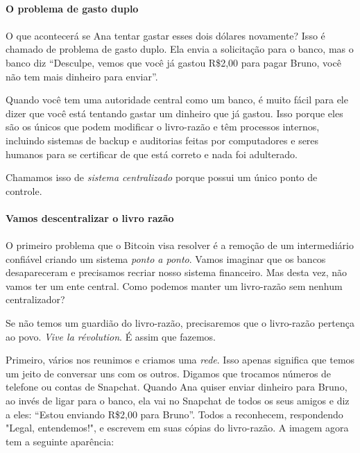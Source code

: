 \paragraph{O problema de gasto duplo}
\paragraph{}

O que acontecerá se Ana tentar gastar esses dois dólares novamente? Isso é chamado de problema de gasto duplo. Ela envia a solicitação para o banco, mas o banco diz “Desculpe, vemos que você já gastou R\$2,00 para pagar Bruno, você não tem mais dinheiro para enviar”.

Quando você tem uma autoridade central como um banco, é muito fácil para ele dizer que você está tentando gastar um dinheiro que já gastou. Isso porque eles são os únicos que podem modificar o livro-razão e têm processos internos, incluindo sistemas de backup e auditorias feitas por computadores e seres humanos para se certificar de que está correto e nada foi adulterado.

Chamamos isso de \textit{sistema centralizado} porque possui um único ponto de controle.

\paragraph{Vamos descentralizar o livro razão}
\paragraph{}

O primeiro problema que o Bitcoin visa resolver é a remoção de um intermediário confiável criando um sistema \textit{ponto a ponto}. Vamos imaginar que os bancos desapareceram e precisamos recriar nosso sistema financeiro. Mas desta vez, não vamos ter um ente central. Como podemos manter um livro-razão sem nenhum centralizador?

Se não temos um guardião do livro-razão, precisaremos que o livro-razão pertença ao povo. \textit{Vive la révolution}. É assim que fazemos.

Primeiro, vários nos reunimos e criamos uma \textit{rede}. Isso apenas significa que temos um jeito de conversar uns com os outros. Digamos que trocamos números de telefone ou contas de Snapchat. Quando Ana quiser enviar dinheiro para Bruno, ao invés de ligar para o banco, ela vai no Snapchat de todos os seus amigos e diz a eles: “Estou enviando R\$2,00 para Bruno”. Todos a reconhecem, respondendo "Legal, entendemos!", e escrevem em suas cópias do livro-razão. A imagem agora tem a seguinte aparência:

